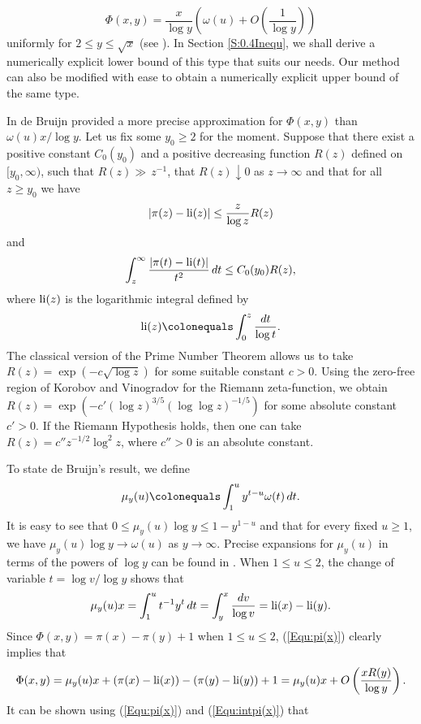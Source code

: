 \documentclass[12pt,reqno]{amsart}
\begin{document}
\begin{equation}\label{Equ:implicitDelta(x,y)}
\Phi(x,y)=\frac{x}{\log y}\left(\omega(u)+O\left(\frac{1}{\log y}\right)\right)
\end{equation}
uniformly for $2\le y\le\sqrt{x}$ (see \cite[Theorem III.6.4]{T}). In Section \ref{S:0.4Inequ}, we shall derive a numerically explicit lower bound of this type that suits our needs. Our method can also be modified with ease to obtain a numerically explicit upper bound of the same type. 
\par In \cite{Br} de Bruijn provided a more precise approximation for $\Phi(x,y)$ than $\omega(u)x/\log y$. Let us fix some $y_0\ge2$ for the moment. Suppose that there exist a positive constant $C_0(y_0)$ and a positive decreasing function $R(z)$ defined on $[y_0,\infty)$, such that $R(z)\gg\, z^{-1}$, that $R(z)\downarrow 0$ as $z\to\infty$ and that for all $z\ge y_0$ we have
\begin{equation}\label{Equ:pi(x)}
|\pi(z)-\operatorname{li}(z)|\le\frac{z}{\log z}R(z)
\end{equation}
and
\begin{equation}\label{Equ:intpi(x)}
\int_{z}^{\infty}\frac{|\pi(t)-\operatorname{li}(t)|}{t^2}\,dt\le C_0(y_0)R(z),
\end{equation}
where $\operatorname{li}(z)$ is the logarithmic integral defined by
\[\li(z)\colonequals\int_{0}^{z}\frac{dt}{\log t}.\]
The classical version of the Prime Number Theorem allows us to take $R(z)=\exp(-c\sqrt{\log z})$ for some suitable constant $c>0$. Using the zero-free region of Korobov and Vinogradov for the Riemann zeta-function, we obtain $R(z)=\exp(-c'(\log z)^{3/5}(\log\log z)^{-1/5})$ for some absolute constant $c'>0$. If the Riemann Hypothesis holds, then one can take $R(z)=c''z^{-1/2}\log^2z$, where $c''>0$ is an absolute constant.
\par To state de Bruijn's result, we define 
\[\mu_y(u)\colonequals\int_{1}^{u}y^{t-u}\omega(t)\,dt.\]
It is easy to see that $0\le\mu_y(u)\log y\le1-y^{1-u}$ and that for every fixed $u\ge1$, we have $\mu_y(u)\log y\to\omega(u)$ as $y\to\infty$. Precise expansions for $\mu_y(u)$ in terms of the powers of $\log y$ can be found in \cite[Theorem III.6.18]{T}. When $1\le u\le 2$, the change of variable $t=\log v/\log y$ shows that 
\[\mu_y(u)x=\int_{1}^{u}t^{-1}y^t\,dt=\int_{y}^{x}\frac{dv}{\log v}=\operatorname{li}(x)-\operatorname{li}(y).\]
Since $\Phi(x,y)=\pi(x)-\pi(y)+1$ when $1\le u\le 2$, (\ref{Equ:pi(x)}) clearly implies that
\[\Phi(x,y)=\mu_y(u)x+(\pi(x)-\operatorname{li}(x))-(\pi(y)-\operatorname{li}(y))+1=\mu_y(u)x+O\left(\frac{xR(y)}{\log y}\right).\]
It can be shown using (\ref{Equ:pi(x)}) and (\ref{Equ:intpi(x)}) that
\end{document}
